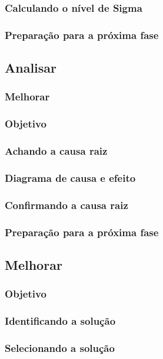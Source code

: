 \documentclass{abnt}
\begin{document}
					\subsubsection {Calculando o nível de Sigma}
					\subsubsection {Preparação para a próxima fase}
				\subsection {Analisar}
					\subsubsection {Melhorar}
					\subsubsection {Objetivo}
					\subsubsection {Achando a causa raiz}
					\subsubsection {Diagrama de causa e efeito}
					\subsubsection {Confirmando a causa raiz}
					\subsubsection {Preparação para a próxima fase}
				\subsection {Melhorar}
					\subsubsection {Objetivo}
					\subsubsection {Identificando a solução}
					\subsubsection {Selecionando a solução}
\end{document}
